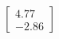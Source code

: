 \documentclass[preview]{standalone}
\begin{document}
\begin{align*}
\begin{bmatrix} 4.77 \\ -2.86 \end{bmatrix}
\end{align*}
\end{document}
